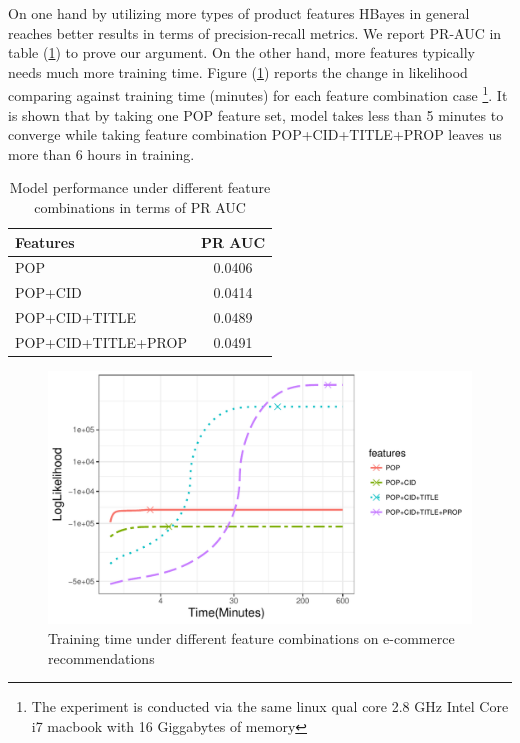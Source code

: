 On one hand by utilizing more types of product features HBayes in general reaches better results in terms of precision-recall metrics.  We report PR-AUC in table (\ref{tab:features_cmp}) to prove our argument.   On the other hand, more features typically needs much more training time.  Figure (\ref{fig:train_time_cmp}) reports the change in likelihood comparing against training time (minutes) for each feature combination case \footnote{The experiment is conducted via the same linux qual core 2.8 GHz Intel Core i7 macbook with 16 Giggabytes of memory}.   It is shown that by taking one POP feature set, model takes less than 5 minutes to converge while taking feature combination POP+CID+TITLE+PROP leaves us more than 6 hours in training.   

\begin{table}[htb]
\centering
\begin{tabular}{l|c}
\toprule
\textbf{Features} & \textbf{PR AUC} \\
\hline
POP & 0.0406 \\
\rowcolor{mygray}
POP+CID & 0.0414 \\
POP+CID+TITLE & 0.0489 \\
\rowcolor{mygray}
POP+CID+TITLE+PROP & 0.0491 \\
\bottomrule
\end{tabular}
\caption{Model performance under different feature combinations in terms of PR AUC}
\label{tab:features_cmp}
\end{table}


\begin{figure}[htb]
\includegraphics[width=0.9\columnwidth,height=0.5\columnwidth]{fig/Lik_time}
\caption{Training time under different feature combinations on e-commerce recommendations}
\label{fig:train_time_cmp}
\end{figure}


